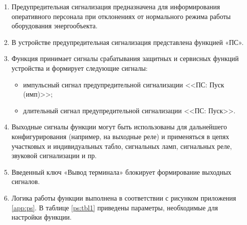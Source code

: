 
\color{black}

\begin{enumerate}

\item	
Предупредительная сигнализация предназначена для информирования оперативного персонала при отклонениях от нормального режима работы оборудования энергообъекта.

\item
В устройстве предупредительная сигнализация представлена функцией «ПС».

\item
Функция принимает сигналы срабатывания защитных и сервисных функций устройства и формирует следующие сигналы:
\begin{itemize}
	\item импульсный сигнал предупредительной сигнализации <<ПС: Пуск (имп)>>;
	\item длительный сигнал предупредительной сигнализации <<ПС: Пуск>>.
\end{itemize}

\item
Выходные сигналы функции могут быть использованы для дальнейшего конфигурирования (например, на выходные реле) и применяться в цепях участковых и индивидуальных табло, сигнальных ламп, сигнальных реле, звуковой сигнализации и пр.

\item
Введенный ключ «Вывод терминала» блокирует формирование выходных сигналов.

\item
Логика работы функции выполнена в соответствии с рисунком приложения \ref{app:ps}. В таблице \ref{ps:tbl1} приведены параметры, необходимые для настройки функции. 

\end{enumerate}